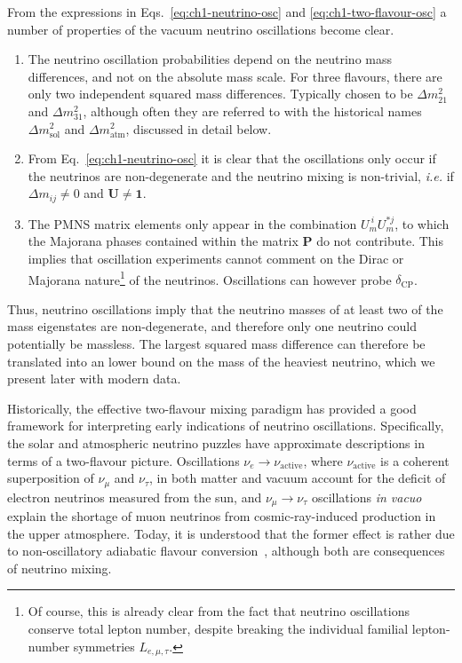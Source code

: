 From the expressions in Eqs.~\eqref{eq:ch1-neutrino-osc} and
\eqref{eq:ch1-two-flavour-osc} a number of properties of the vacuum neutrino
oscillations become clear.
\begin{enumerate}
  \item The neutrino oscillation probabilities depend on the neutrino mass
  differences, and not on the absolute mass scale. For three flavours, there
  are only two independent squared mass differences. Typically chosen to be
  $\Delta m_{21}^{2}$ and $\Delta m_{31}^{2}$, although often they are
  referred to with the historical names $\Delta m_{\text{sol}}^{2}$ and
  $\Delta m_{\text{atm}}^{2}$, discussed in detail below.
  \item From Eq.~\eqref{eq:ch1-neutrino-osc} it is clear that the oscillations only
  occur if the neutrinos are non-degenerate and the neutrino mixing is
  non-trivial, \textit{i.e.} if $\Delta m_{ij} \neq 0$ and
  $\mathbf{U} \neq \mathbf{1}$.
  \item The PMNS matrix elements only appear in the combination
  $U_{m}^{\ i} U_{m}^{* j}$, to which the Majorana phases contained within the
  matrix $\mathbf{P}$ do not contribute. This implies that oscillation
  experiments cannot comment on the Dirac or Majorana nature\footnote{Of
    course, this is already clear from the fact that neutrino oscillations
    conserve total lepton number, despite breaking the individual familial
    lepton-number symmetries $L_{e, \mu, \tau}$.} of the neutrinos. Oscillations
  can however probe $\delta_{\text{CP}}$.
\end{enumerate}
Thus, neutrino oscillations imply that the neutrino masses of at least two of
the mass eigenstates are non-degenerate, and therefore only one neutrino could
potentially be massless. The largest squared mass difference can therefore be
translated into an lower bound on the mass of the heaviest neutrino, which we
present later with modern data.

Historically, the effective two-flavour mixing paradigm has provided a good
framework for interpreting early indications of neutrino oscillations.
Specifically, the solar and atmospheric neutrino puzzles have approximate
descriptions in terms of a two-flavour picture. Oscillations
$\nu_{e} \to \nu_{\text{active}}$, where $\nu_{\text{active}}$ is a coherent
superposition of $\nu_{\mu}$ and $\nu_{\tau}$, in both matter and vacuum account
for the deficit of electron neutrinos measured from the sun, and
$\nu_{\mu} \to \nu_{\tau}$ oscillations \textit{in vacuo} explain the shortage
of muon neutrinos from cosmic-ray-induced production in the upper atmosphere.
Today, it is understood that the former effect is rather due to non-oscillatory
adiabatic flavour conversion~\cite{Smirnov:2016xzf}, although both are
consequences of neutrino mixing.


